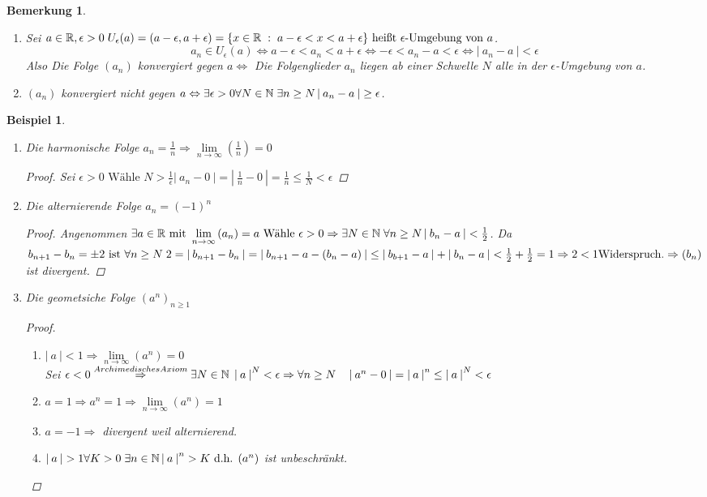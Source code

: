 \documentclass[a4paper,titlepage,oneside]{article}
\def\N{\ensuremath{\mathbb{N}} }
\def\R{\ensuremath{\mathbb{R}} }
\def\WSP{\text{Widerspruch.}}
\newcommand{\abs}[1]{\ensuremath{\left|\:#1\:\right|}}
\def\sp{\hspace{0,1cm}}
\renewcommand{\liminf}[2]{\ensuremath{\lim\limits_{#1 \rightarrow \infty}{\left(#2\right)}}}
\newcommand{\menge}[2]{\ensuremath{\{#1\sp : \sp #2\}}}
\theoremstyle{thmstyle}
\newtheorem{bsp}[satz]{Beispiel}
\newtheorem{bem}[satz]{Bemerkung}
\begin{document}
\begin{bem}
\begin{enumerate}
\item Sei \(a \in \R, \epsilon > 0 \sp U_\epsilon(a) = (a-\epsilon, a+\epsilon) = \menge{x \in \R}{a - \epsilon < x < a + \epsilon}\text{ heißt }\epsilon\text{-Umgebung von }a\).
\[ a_n \in U_\epsilon(a) \Leftrightarrow a-\epsilon < a_n < a + \epsilon \Leftrightarrow -\epsilon < a_n - a < \epsilon \Leftrightarrow \abs{a_n - a} < \epsilon\]
Also Die Folge \((a_n)\) konvergiert gegen \(a \Leftrightarrow \) Die Folgenglieder \(a_n\) liegen ab einer Schwelle \(N\) alle in der \(\epsilon\)-Umgebung von \(a\).
\item \((a_n)\) konvergiert nicht gegen \(a \Leftrightarrow \exists \epsilon > 0 \forall N\in\N \sp \exists n \ge N \abs{a_n - a} \ge \epsilon\).
\end{enumerate}
\end{bem}

\begin{bsp}
\begin{enumerate}[label=(\arabic*)]
\item Die harmonische Folge \(a_n = \frac{1}{n} \Rightarrow \liminf{n}{\frac{1}{n}} = 0\)
\begin{proof}
Sei \(\epsilon > 0 \text{ Wähle } N > \frac{1}{\epsilon} \abs{a_n - 0} = \abs{\frac{1}{n} - 0} = \frac{1}{n} \le \frac{1}{N} < \epsilon\)
\end{proof}
\item Die alternierende Folge \(a_n = (-1)^n\)
\begin{proof}
Angenommen \(\exists a \in \R \text{ mit } \liminf{n}{a_n} = a \text{ Wähle } \epsilon > 0 \Rightarrow \exists N \in \N \sp \forall n \ge N \abs{b_n - a} < \frac{1}{2}\).
Da \(b_{n+1} - b_n = \pm 2 \text{ ist } \forall n \ge N \sp 2 = \abs{b_{n+1} - b_{n}} = \abs{b_{n+1} - a - (b_n - a)} \le \abs{b_{b+1} - a} + \abs{b_n - a} < \frac{1}{2} + \frac{1}{2} = 1 \Rightarrow 2 < 1 \WSP \Rightarrow (b_n) \) ist divergent.
\end{proof}
\item Die geometsiche Folge \((a^n)_{n\ge1}\)
\begin{proof}
\begin{enumerate}[label=\arabic*. Fall]
\item \(\abs{a} < 1 \Rightarrow \liminf{n}{a^n} = 0\) \\
Sei \(\epsilon < 0 \overset{Archimedisches Axiom}{\Rightarrow} \exists N \in \N \sp \abs{a}^N < \epsilon \Rightarrow \forall n \ge N \quad \abs{a^n - 0} = \abs{a}^n \le \abs{a}^N < \epsilon\)
\item \(a = 1 \Rightarrow a^n = 1 \Rightarrow \liminf{n}{a^n} = 1\)
\item \(a = -1 \Rightarrow \) divergent weil alternierend.
\item \(\abs{a} > 1 \forall K > 0 \sp \exists n \in \N \abs{a}^n > K \text{ d.h. } (a^n)\) ist unbeschränkt.
\end{enumerate}
\end{proof}
\end{enumerate}
\end{bsp}
\end{document}
